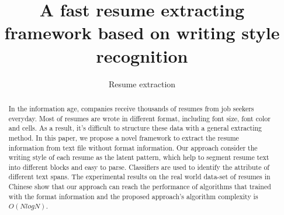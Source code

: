 \documentclass{acm_proc_article-sp}
\begin{document}
\title{A fast resume extracting framework based on writing style recognition}
\subtitle{Resume extraction}


%

\maketitle
\begin{abstract}


In the information age, companies receive thousands of resumes from job seekers everyday. 
Most of resumes are wrote in different format, including font size, font color and cells.
As a result, it's difficult to structure these data with a general extracting method. 
In this paper, we propose a novel framework to extract the resume information from text file without format information. 
Our approach consider the writing style of each resume as the latent pattern, which help to segment resume text into different blocks and easy to parse.
Classifiers are used to identify the attribute of different text spans.
The experimental results on the real world data-set of resumes in Chinese show that our approach can reach the performance of algorithms that trained with the format information and the proposed approach's algorithm complexity is $O(NlogN)$.


\end{abstract}
\end{document}

